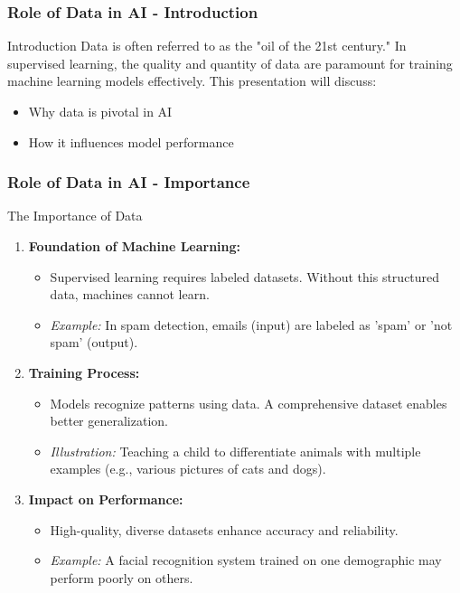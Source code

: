 \documentclass[aspectratio=169]{beamer}
\begin{document}
\begin{frame}[fragile]
    \frametitle{Role of Data in AI - Introduction}
    \begin{block}{Introduction}
        Data is often referred to as the "oil of the 21st century." In supervised learning, the quality and quantity of data are paramount for training machine learning models effectively. This presentation will discuss:
    \end{block}
    \begin{itemize}
        \item Why data is pivotal in AI
        \item How it influences model performance
    \end{itemize}
\end{frame}

\begin{frame}[fragile]
    \frametitle{Role of Data in AI - Importance}
    \begin{block}{The Importance of Data}
        \begin{enumerate}
            \item \textbf{Foundation of Machine Learning:}
                  \begin{itemize}
                      \item Supervised learning requires labeled datasets. Without this structured data, machines cannot learn.
                      \item \textit{Example:} In spam detection, emails (input) are labeled as 'spam' or 'not spam' (output).
                  \end{itemize}
                  
            \item \textbf{Training Process:}
                  \begin{itemize}
                      \item Models recognize patterns using data. A comprehensive dataset enables better generalization.
                      \item \textit{Illustration:} Teaching a child to differentiate animals with multiple examples (e.g., various pictures of cats and dogs).
                  \end{itemize}
                  
            \item \textbf{Impact on Performance:}
                  \begin{itemize}
                      \item High-quality, diverse datasets enhance accuracy and reliability.
                      \item \textit{Example:} A facial recognition system trained on one demographic may perform poorly on others.
                  \end{itemize}
        \end{enumerate}
    \end{block}
\end{frame}
\end{document}
